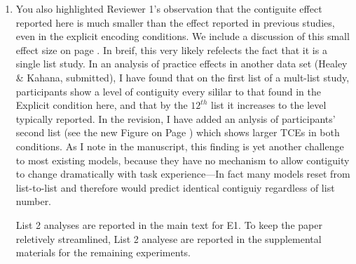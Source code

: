 \documentclass[12pt]{article}
\begin{document}
\begin{enumerate}
\item
	You also highlighted Reviewer 1's observation that the contiguite effect reported here is much smaller than the effect reported in previous studies, even in the explicit encoding conditions. We include a discussion of this small effect size on page \pageref{TODO-5}. In breif, this very likely refelects the fact that it is a single list study. In an analysis of practice effects in another data set (Healey \& Kahana, submitted), I have found that on the first list of a mult-list study, participants show a level of contiguity every sililar to that found in the Explicit condition here, and that by the $12^{th}$ list it increases to the level typically reported. In the revision, I have added an anlysis of participants' second list (see the new Figure on Page \pageref{TODO-6}) which shows larger TCEs in both conditions.  As I note in the manuscript, this finding is yet another challenge to most existing models, because they have no mechanism to allow contiguity to change dramatically with task experience---In fact many models reset from list-to-list and therefore would predict identical contiguiy regardless of list number.

	List 2 analyses are reported in the main text for E1. To keep the paper reletively streamlined, List 2 analyese are reported in the supplemental materials for the remaining experiments.



\end{enumerate}
\end{document}
